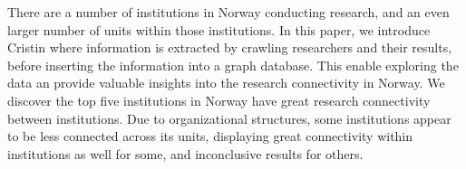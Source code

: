 There are a number of institutions in Norway conducting research, and an even larger number of units within those institutions.
In this paper, we introduce Cristin\cite{CRISTIN-about} where information is extracted by crawling researchers and their results, before inserting the information into a graph database.
This enable exploring the data an provide valuable insights into the research connectivity in Norway.
We discover the top five institutions in Norway have great research connectivity between institutions.
Due to organizational structures, some institutions appear to be less connected across its units, displaying great connectivity within institutions as well for some, and inconclusive results for others.
